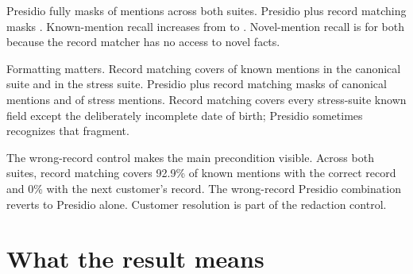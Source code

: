 \documentclass[11pt]{article}
\begin{document}
Presidio fully masks \AllPresidioMentionRecall{} of mentions across both suites.
Presidio plus record matching masks \AllPresidioRecordMentionRecall{}.
Known-mention recall increases from \AllPresidioKnownRecall{} to
\AllPresidioRecordKnownRecall{}. Novel-mention recall is
\AllPresidioNovelRecall{} for both because the record matcher has no access to
novel facts.

Formatting matters. Record matching covers \CanonicalRecordKnownRecall{} of
known mentions in the canonical suite and \StressRecordKnownRecall{} in the
stress suite. Presidio plus record matching masks
\CanonicalPresidioRecordMentionRecall{} of canonical mentions and
\StressPresidioRecordMentionRecall{} of stress mentions. Record matching covers
every stress-suite known field except the deliberately incomplete date of birth;
Presidio sometimes recognizes that fragment.

\begin{table}[htbp]
\centering
\caption{Redaction results on the deterministic synthetic corpus. Mention R is
the share of labeled mentions whose letters and digits are all masked. Known
and novel R split that denominator by whether the mention derives from the resolved customer record.
Character $F_2$ ignores labels and weights recall twice as much as precision.
Strict $F_1$ requires the exact boundary and label. FP spans have no character
overlap with a labeled PII span. The All rows pool two designed suites and are
not population estimates.}
\label{tab:metrics}
\scriptsize
\resizebox{\textwidth}{!}{}
\end{table}

The wrong-record control makes the main precondition visible. Across both
suites, record matching covers 92.9\% of known mentions with the correct record
and 0\% with the next customer's record. The wrong-record Presidio combination
reverts to Presidio alone. Customer resolution is part of the redaction control.

\begin{table}[htbp]
\centering
\caption{Record-resolution control across both suites. Each chat is run with
its correct customer profile and with the next synthetic customer's profile.
The columns report full-mention recall and label-blind character $F_2$.}
\label{tab:resolution}
\small
\resizebox{\textwidth}{!}{}
\end{table}

\section*{What the result means}
\end{document}
